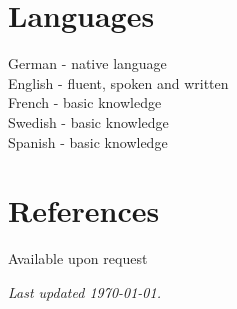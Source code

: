 \documentclass[margin,line]{res}
\begin{document}
\begin{resume}

\section{\sc Languages} 
German - native language\\English  - fluent, spoken and written  \\French - basic knowledge \\Swedish - basic knowledge \\Spanish - basic knowledge


\section{\sc References} 
Available upon request

\vfill
 \hfill \emph{Last updated {\today}.}

\end{resume}
\end{document}
